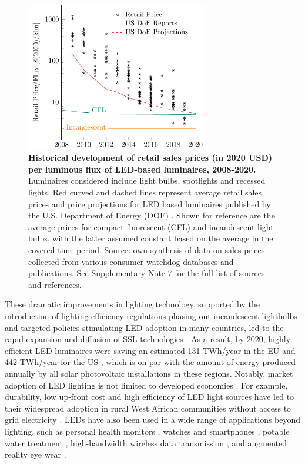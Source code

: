 \documentclass[parskip=full]{article}
\begin{document}
\begin{figure}[h!]
\centering
  \includegraphics[height=6.5cm]{figures/cost_lamp_small.pdf}
  \caption{\textbf{Historical development of retail sales prices (in 2020 USD) per luminous flux of LED-based luminaires, 2008-2020.} Luminaires considered include light bulbs, spotlights and recessed lights. Red curved and dashed lines represent average retail sales prices and price projections for LED based luminaires published by the U.S. Department of Energy (DOE) \cite{national2013assessment}. Shown for reference are the average prices for compact fluorescent (CFL) and incandescent light bulbs, with the latter assumed constant based on the average in the covered time period. Source: own synthesis of data on sales prices collected from various consumer watchdog databases and publications. See Supplementary Note 7 for the full list of sources and references.}
  \label{fgr:cost_lamp_small}
\end{figure}

These dramatic improvements in lighting technology, supported by the introduction of lighting efficiency regulations phasing out incandescent lightbulbs and targeted policies stimulating LED adoption in many countries, led to the rapid expansion and diffusion of SSL technologies \cite{weinold2020long, stegmaier2021incandescent, Mills2014}. As a result, by 2020, highly efficient LED luminaires were saving an estimated 131 TWh/year in the EU \cite{eu2019impactass} and 442 TWh/year for the US \cite{guidehouse2020adoption}, which is on par with the amount of energy produced annually by all solar photovoltaic installations in these regions. Notably, market adoption of LED lighting is not limited to developed economies \cite{Kamat2020}. For example, durability, low up-front cost and high efficiency of LED light sources have led to their widespread adoption in rural West African communities without access to grid electricity \cite{Bensch2017}. LEDs have also been used in a wide range of applications beyond lighting, such as personal health monitors \cite{Wyatt2020}, watches and smartphones \cite{Bai2017}, potable water treatment \cite{Lui2014}, high-bandwidth wireless data transmission \cite{Haas2016}, and augmented reality eye wear \cite{Lee2016}. 
\end{document}
